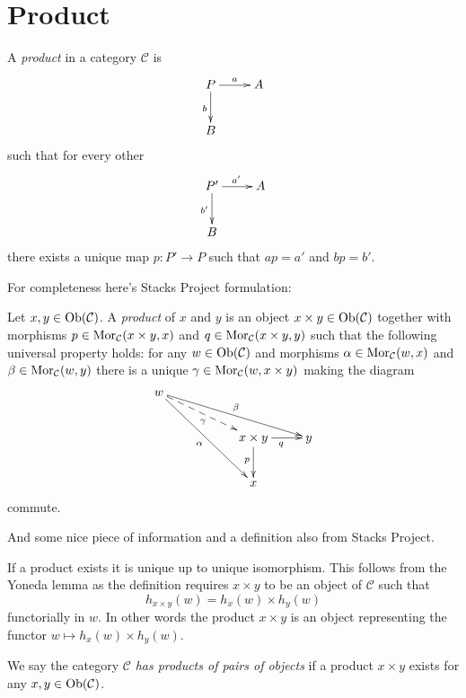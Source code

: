 \section{Product}
\label{section-product}

\begin{definition}
\label{definition-product}
A {\it product} in a category $\mathcal{C}$ is
$$
\xymatrix{
P\ar[d]_b \ar[r]^a&A\\
B
}
$$
such that for every other
$$
\xymatrix{
P'\ar[d]_{b'} \ar[r]^{a'}&A\\
B
}
$$
there exists a unique map $p:P'\to P$ such that
$ap=a'$ and  $bp=b'$.

\end{definition}

For completeness here's Stacks Project formulation:

\begin{definition}
\label{definition-products}
Let $x, y\in \mathop{\mathrm{Ob}}\nolimits(\mathcal{C})$.
A {\it product} of $x$ and $y$ is
an object $x \times y \in \mathop{\mathrm{Ob}}\nolimits(\mathcal{C})$
together with morphisms
$p\in \mathop{\mathrm{Mor}}\nolimits_{\mathcal C}(x \times y, x)$ and
$q\in\mathop{\mathrm{Mor}}\nolimits_{\mathcal C}(x \times y, y)$ such
that the following universal property holds: for
any $w\in \mathop{\mathrm{Ob}}\nolimits(\mathcal{C})$ and morphisms
$\alpha \in \mathop{\mathrm{Mor}}\nolimits_{\mathcal C}(w, x)$ and
$\beta \in \mathop{\mathrm{Mor}}\nolimits_\mathcal{C}(w, y)$
there is a unique
$\gamma\in \mathop{\mathrm{Mor}}\nolimits_{\mathcal C}(w, x \times y)$ making
the diagram
$$
\xymatrix{
w \ar[rrrd]^\beta \ar@{-->}[rrd]_\gamma \ar[rrdd]_\alpha & & \\
& & x \times y \ar[d]_p \ar[r]_q & y \\
& & x &
}
$$
commute.
\end{definition}

And some nice piece of information and a definition also from Stacks Project.

\medskip\noindent
If a product exists it is unique up to unique
isomorphism. This follows from the Yoneda lemma as
the definition requires $x \times y$ to be an object
of $\mathcal{C}$ such that
$$
h_{x \times y}(w) = h_x(w) \times h_y(w)
$$
functorially in $w$. In other words the product $x \times y$
is an object representing the functor
$w \mapsto h_x(w) \times h_y(w)$.

\begin{definition}
\label{definition-has-products-of-pairs}
We say the category $\mathcal{C}$ {\it has products of pairs
of objects} if a product $x \times y$
exists for any $x, y \in \mathop{\mathrm{Ob}}\nolimits(\mathcal{C})$.
\end{definition}

